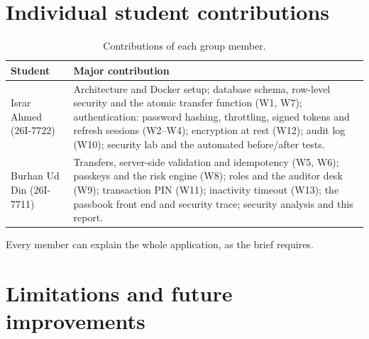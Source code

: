 \documentclass[11pt,a4paper]{article}
\begin{document}
\section{Individual student contributions}

\begin{table}[H]
\centering\small
\caption{Contributions of each group member.}
\begin{tabularx}{\textwidth}{P{4cm}Y}
\toprule
Student & Major contribution \\
\midrule
Israr Ahmed (26I-7722) & Architecture and Docker setup; database schema, row-level security and the atomic transfer function (W1, W7); authentication: password hashing, throttling, signed tokens and refresh sessions (W2--W4); encryption at rest (W12); audit log (W10); security lab and the automated before/after tests. \\
Burhan Ud Din (26I-7711) & Transfers, server-side validation and idempotency (W5, W6); passkeys and the risk engine (W8); roles and the auditor desk (W9); transaction PIN (W11); inactivity timeout (W13); the passbook front end and security trace; security analysis and this report. \\
\bottomrule
\end{tabularx}
\end{table}

Every member can explain the whole application, as the brief requires.

\section{Limitations and future improvements}
\end{document}
